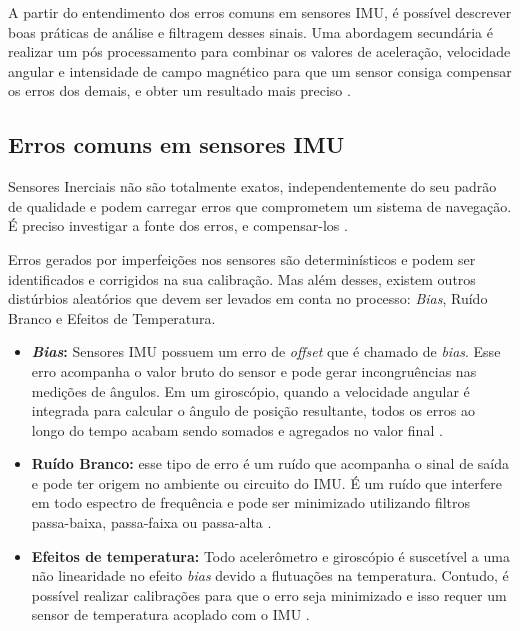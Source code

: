 A partir do entendimento dos erros comuns em sensores IMU, é possível descrever boas práticas de análise e filtragem desses sinais. Uma abordagem secundária é realizar um pós processamento para combinar os valores de aceleração, velocidade angular e intensidade de campo magnético para que um sensor consiga compensar os erros dos demais, e obter um resultado mais preciso \cite{manual:cambimu}.

\subsection{Erros comuns em sensores IMU}

Sensores Inerciais não são totalmente exatos, independentemente do seu padrão de qualidade e podem carregar erros que comprometem um sistema de navegação. É preciso investigar a fonte dos erros, e compensar-los \cite{diss:FabioAUV}.

Erros gerados por imperfeições nos sensores são determinísticos e podem ser identificados e corrigidos na sua calibração. Mas além desses, existem outros distúrbios aleatórios que devem ser levados em conta no processo: \textit{Bias}, Ruído Branco e Efeitos de Temperatura.

\begin{itemize}
	\item \textbf{\textit{Bias}:} Sensores IMU possuem um erro de \textit{offset} que é chamado de \textit{bias}. Esse erro acompanha o valor bruto do sensor e pode gerar incongruências nas medições de ângulos. Em um giroscópio, quando a velocidade angular é integrada para calcular o ângulo de posição resultante, todos os erros ao longo do tempo acabam sendo somados e agregados no valor final \cite{manual:cambimu}. 
	
	\item \textbf{Ruído Branco:} esse tipo de erro é um ruído que acompanha o sinal de saída e pode ter origem no ambiente ou circuito do IMU. É um ruído que interfere em todo  espectro de frequência e pode ser minimizado utilizando filtros passa-baixa, passa-faixa ou passa-alta \cite{diss:FabioAUV}.
	
	\item \textbf{Efeitos de temperatura:} Todo acelerômetro e giroscópio é suscetível a uma não linearidade no efeito \textit{bias} devido a flutuações na temperatura. Contudo, é possível realizar calibrações para que o erro seja minimizado e isso requer um sensor de temperatura acoplado com o IMU \cite{manual:cambimu}. 
\end{itemize}


